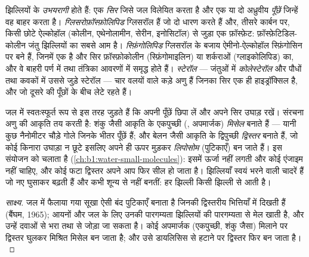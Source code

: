 \begin{definition}[उभयरागी लिपिड]\label{def:b1:lipids:amphiphilic}
झिल्लियों के  \emph{उभयरागी} होते हैं: एक  \emph{सिर} जिसे जल विलेयित करता है और एक या दो
अध्रुवीय \emph{पूँछें} जिन्हें वह बाहर करता है।
\emph{ग्लिसरोफ़ॉस्फ़ोलिपिड} ग्लिसरॉल हैं जो दो
 धारण करते हैं और, तीसरे कार्बन पर, किसी छोटे  ऐल्कोहॉल
(कोलीन, एथेनोलामीन, सेरीन, इनोसिटॉल) से जुड़ा एक फ़ॉस्फ़ेट:
फ़ॉस्फ़ेटिडिल-कोलीन जंतु झिल्लियों का सबसे आम  है।
\emph{स्फ़िंगोलिपिड}
ग्लिसरॉल के बजाय ऐमीनो-ऐल्कोहॉल स्फ़िंगोसिन पर बने हैं, जिनमें एक  है और सिर फ़ॉस्फ़ोकोलीन (स्फ़िंगोमाइलिन) या शर्कराओं
(ग्लाइकोलिपिड) का, और वे बाहरी पर्ण में तथा तंत्रिका आवरणों में समृद्ध
होते हैं। \emph{स्टेरॉल} --- जंतुओं में \emph{कोलेस्टेरॉल}
और पौधों तथा कवकों में उससे जुड़े स्टेरॉल --- चार वलयों वाले कड़े अणु
हैं जिनका सिर एक ही हाइड्रॉक्सिल है, और जो दूसरे  की पूँछों के बीच
लेटे रहते हैं।
\end{definition}

\begin{proposition}[स्वयं-संयोजन]\label{prop:b1:lipids:selfassembly}
जल में  स्वतःस्फूर्त रूप से इस तरह जुड़ते हैं कि अपनी पूँछें
छिपा लें और अपने सिर उघाड़ रखें। संरचना अणु की आकृति तय करती है:
शंकु जैसी आकृति के एकपुच्छी  (, अपमार्जक)
\emph{मिसेल} बनाते हैं --- यानी कुछ नैनोमीटर चौड़े गोले जिनके भीतर
पूँछें हैं; और बेलन जैसी आकृति के द्विपुच्छी 
\emph{द्विस्तर} बनाते हैं, जो कोई किनारा उघाड़ा न छूटे इसलिए अपने ही ऊपर
मुड़कर \emph{लिपोसोम} (पुटिकाएँ) बन जाते हैं। इस संयोजन को  चलाता है (\cref{ch:b1:water-small-molecules}):
इसमें ऊर्जा नहीं लगती और कोई एंजाइम नहीं चाहिए, और कोई फटा द्विस्तर अपने
आप फिर सील हो जाता है। झिल्लियाँ स्वयं भरने वाली चादरें हैं जो नए 
घुसाकर बढ़ती हैं और कभी शून्य से नहीं बनतीं: हर झिल्ली किसी झिल्ली से
आती है।
\end{proposition}
\begin{proof}[साक्ष्य]
जल में फैलाया गया सूखा  ऐसी बंद पुटिकाएँ बनाता है जिनकी
द्विस्तरीय भित्तियाँ  में दिखती हैं (बैंघम, 1965);
आयनों और जल के लिए उनकी पारगम्यता  झिल्लियों की पारगम्यता से मेल
खाती है, और उन्हें दवाओं से भरा तथा  से जोड़ा जा सकता है। कोई
अपमार्जक (एकपुच्छी, शंकु जैसा) मिलाने पर द्विस्तर घुलकर मिश्रित मिसेल बन
जाता है; और उसे डायलिसिस से हटाने पर द्विस्तर फिर बन जाता है।
\end{proof}

